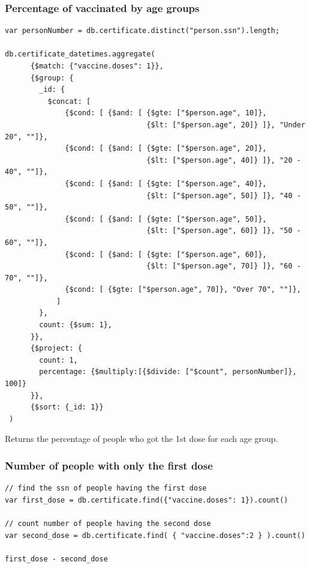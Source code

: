 \documentclass[12pt, a4paper]{article}
\begin{document}
\subsubsection{Percentage of vaccinated by age groups}
\begin{tcolorbox}[fontupper=\scriptsize]
    \begin{verbatim}
var personNumber = db.certificate.distinct("person.ssn").length;

db.certificate_datetimes.aggregate(
      {$match: {"vaccine.doses": 1}},
      {$group: {
        _id: {
          $concat: [
              {$cond: [ {$and: [ {$gte: ["$person.age", 10]},
                                 {$lt: ["$person.age", 20]} ]}, "Under 20", ""]},
              {$cond: [ {$and: [ {$gte: ["$person.age", 20]}, 
                                 {$lt: ["$person.age", 40]} ]}, "20 - 40", ""]},
              {$cond: [ {$and: [ {$gte: ["$person.age", 40]}, 
                                 {$lt: ["$person.age", 50]} ]}, "40 - 50", ""]},
              {$cond: [ {$and: [ {$gte: ["$person.age", 50]}, 
                                 {$lt: ["$person.age", 60]} ]}, "50 - 60", ""]},
              {$cond: [ {$and: [ {$gte: ["$person.age", 60]}, 
                                 {$lt: ["$person.age", 70]} ]}, "60 - 70", ""]},
              {$cond: [ {$gte: ["$person.age", 70]}, "Over 70", ""]},
            ]
        },
        count: {$sum: 1},
      }},
      {$project: {
        count: 1,
        percentage: {$multiply:[{$divide: ["$count", personNumber]}, 100]}
      }},
      {$sort: {_id: 1}}
 )
    \end{verbatim}
\end{tcolorbox}
\noindent 
Returns the percentage of people who got the 1st dose for each age group.

\subsubsection{Number of people with only the first dose}
\begin{tcolorbox}[fontupper=\scriptsize]
    \begin{verbatim}
// find the ssn of people having the first dose
var first_dose = db.certificate.find({"vaccine.doses": 1}).count()

// count number of people having the second dose
var second_dose = db.certificate.find( { "vaccine.doses":2 } ).count()

first_dose - second_dose
    \end{verbatim}
\end{tcolorbox}
\end{document}
